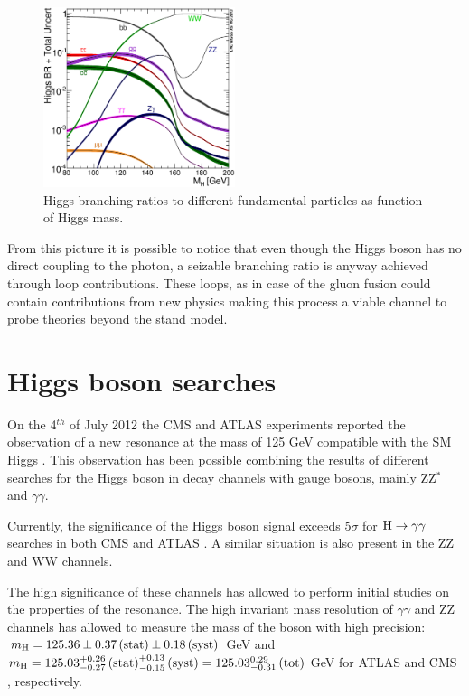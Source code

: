\begin{figure}
\centering
\includegraphics[width=0.5\textwidth]{1_Introduction_Th_and_Exp/pics/Higgs_BR_LM.eps}
\caption{Higgs branching ratios to different fundamental particles as function of Higgs mass.}
\label{fig:hbr}
\end{figure}

From this picture it is possible to notice that even though the Higgs boson has no direct coupling to the photon, a seizable branching ratio is anyway achieved through loop contributions. These loops, as in case of the gluon fusion could contain contributions from new physics making this process a viable channel to probe theories beyond the stand model.

\section{Higgs boson searches}

On the 4$^{th}$ of July 2012 the CMS and ATLAS experiments reported the observation of a new resonance at the mass of 125 GeV compatible with the SM Higgs \cite{Chatrchyan:2013lba}. This observation has been possible combining the results of different searches for the Higgs boson in decay channels with gauge bosons, mainly ZZ$^*$ and $\gamma\gamma$.

Currently, the significance of the Higgs boson signal exceeds 5$\sigma$ for $\mathrm{H}\rightarrow\gamma\gamma$ searches in both CMS and ATLAS \cite{Khachatryan:2014ira, ATLASCONF:2014009}. A similar situation is also present in the ZZ and WW channels.

The high significance of these channels has allowed to perform initial studies on the properties of the resonance. The high invariant mass resolution of $\gamma\gamma$ and ZZ channels has allowed to measure the mass of the boson with high precision: $m_{\mathrm{H}} = 125.36 \pm 0.37\, \mathrm{(stat)} \pm 0.18\, \mathrm{(syst)}$ GeV and $m_{\mathrm{H}} = 125.03^{+0.26}_{-0.27} \,\mathrm{(stat)}^{+0.13}_{-0.15}  \,\mathrm{(syst)} = 125.03^{0.29}_{-0.31} \, \mathrm{(tot)}$ GeV for ATLAS \cite{Aad:2014aba} and CMS \cite{CMS:2014ega}, respectively.


